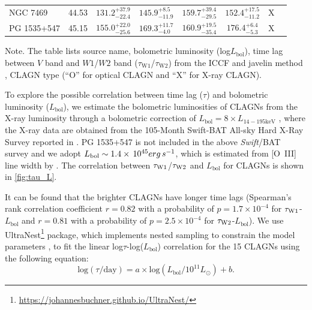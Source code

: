 \documentclass[linenumbers]{aastex631}
\newcommand{\bat}{{\small {\it Swift}/BAT}}
\begin{document}
\begin{table}
\begin{center}
\begin{tabular}{lccccccc}
NGC 7469 & 44.53 & $131.2_{-22.4}^{+37.9}$ & $145.9_{-11.9}^{+8.5}$ & $159.7_{-29.5}^{+39.4}$ & $152.4_{-11.2}^{+17.5}$ & X \\
PG 1535+547 & 45.15 & $155.0_{-25.6}^{+22.0}$ & $169.3_{-4.0}^{+11.7}$ & $160.9_{-35.4}^{+19.5}$ & $176.4_{-5.3}^{+6.4}$ & X \\
\hline\hline
\end{tabular}
\end{center}
Note. The table lists source name, bolometric luminosity (log$L_\mathrm{bol}$), time lag between $V$ band and $W1$/$W2$ band ($\tau_\mathrm{W1}$/$\tau_\mathrm{W2}$) from the ICCF and {\sc javelin} method , CLAGN type (``O'' for optical CLAGN and ``X'' for X-ray CLAGN). 
\end{table}


To explore the possible correlation between time lag ($\tau$) and bolometric luminosity ($L_\mathrm{bol}$), we estimate the bolometric luminosities of CLAGNs from the X-ray luminosity through a bolometric correction of $L_{\mathrm{bol}}=8 \times L_{\mathrm{14-195 keV }}$ \citep[e.g.,][]{2009MNRAS.392.1124V}, where the X-ray data are obtained from the 105-Month Swift-BAT All-sky Hard X-Ray Survey reported in \citet{2018ApJS..235....4O}. PG 1535+547 is not included in the above \bat\, survey and we adopt $L_{\mathrm{\rm bol}}\sim 1.4\times \, 10^{45} erg\, s^{-1}$, which is estimated from [O~{\small III}] line width by \citet{2006ApJ...653..137Z}. The correlation between $\tau_{\rm{W1}}$/$\tau_{\rm{W2}}$ and $L_\mathrm{bol}$ for CLAGNs is shown in \autoref{fig:tau_L}.

It can be found that the brighter CLAGNs have longer time lags (Spearman's rank correlation coefficient $r=0.82$ with a probability of $p=1.7\times10^{-4}$ for $\tau_{\rm{W1}}$-$L_\mathrm{bol}$ and $r=0.81$ with a probability of $p=2.5\times10^{-4}$ for $\tau_{\rm{W2}}$-$L_\mathrm{bol}$). We use UltraNest\footnote{\url{https://johannesbuchner.github.io/UltraNest/}} package, which implements nested sampling to constrain the model parameters \citep{2021JOSS....6.3001B}, to fit the linear log$\tau$-log($L_{\mathrm{bol}}$) correlation for the 15 CLAGNs using the following equation: 
\begin{equation}
\mathrm{log}(\tau/\mathrm{day})=a\times\mathrm{log}(L_{\mathrm{bol}}/10^{11} L_{\odot})+b.
\end{equation}
\end{document}
